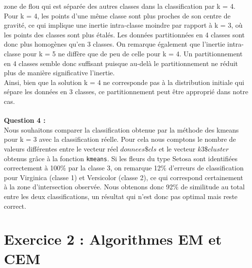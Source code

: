 \documentclass[a4paper, 10pt]{article}
\begin{document}
zone de flou qui est séparée des autres classes dans la classification par k = 4.
\newpage
\noindent
Pour  k = 4, les points d'une même classe sont plus proches de son centre de gravité,
ce qui implique une inertie intra-classe moindre par rapport à k = 3, où les points des classes sont plus étalés.
Les données partitionnées en 4 classes sont donc plus homogènes qu'en 3 classes.
On remarque également que l'inertie intra-classe pour k = 5 ne diffère que de peu de celle pour k = 4.
Un partitionnement en 4 classes semble donc suffisant puisque au-delà le partitionnement ne réduit plus de manière significative l’inertie.\\
Ainsi, bien que la solution k = 4 ne corresponde pas à la distribution initiale qui sépare les données en 3 classes,
ce partitionnement peut être approprié dans notre cas.\\ \\
\textbf{Question 4 :}\\
Nous souhaitons comparer la classification obtenue par la méthode des kmeans pour k = 3 avec la classification réelle.
Pour cela nous comptons le nombre de valeurs différentes entre le vecteur réel $donnees\$cls$ et le vecteur $k3\$cluster$ obtenus
grâce à la fonction \texttt{kmeans}. 
Si les fleurs du type Setosa sont identifiées correctement à 100\% par la classe 3,
on remarque 12\% d'erreurs de classification pour Virginica (classe 1) et Versicolor (classe 2),
ce qui correspond certainement à la zone d'intersection observée. 
Nous obtenons donc 92\% de similitude au total entre les deux classifications, un résultat qui n'est donc pas optimal mais reste correct.

\section*{Exercice 2 : Algorithmes EM et CEM}
\end{document}
